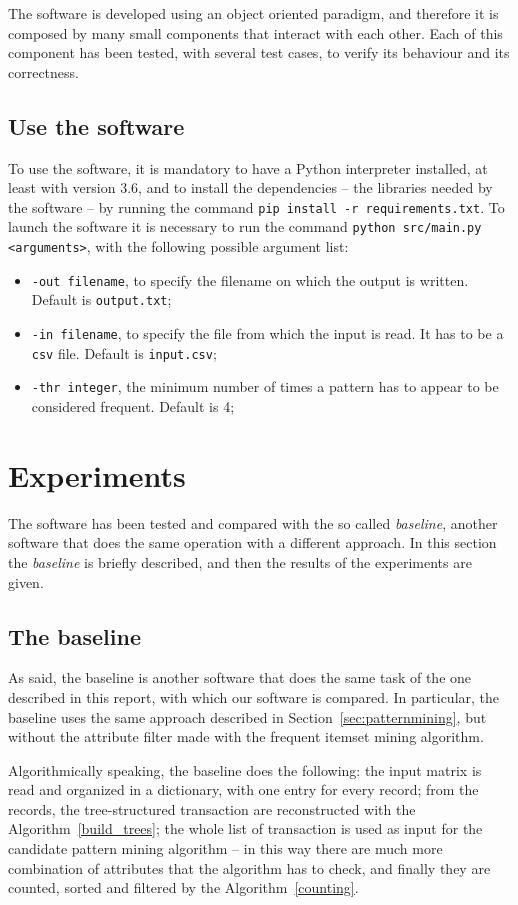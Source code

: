 \documentclass{acm_proc_article-sp-sigmod09}
\begin{document}
The software is developed using an object oriented paradigm, and therefore it is composed by many small components that interact with each other. Each of this component has been tested, with several test cases, to verify its behaviour and its correctness.

\subsection{Use the software}
To use the software, it is mandatory to have a Python interpreter installed, at least with version 3.6, and to install the dependencies -- the libraries needed by the software -- by running the command \texttt{pip install -r requirements.txt}. To launch the software it is necessary to run the command \texttt{python src/main.py <arguments>}, with the following possible argument list:
\begin{itemize}
\item \texttt{-out filename}, to specify the filename on which the output is written. Default is \texttt{output.txt};
\item \texttt{-in filename}, to specify the file from which the input is read. It has to be a \texttt{csv} file. Default is \texttt{input.csv};
\item \texttt{-thr integer}, the minimum number of times a pattern has to appear to be considered frequent. Default is 4;
\end{itemize}
 
\section{Experiments}
The software has been tested and compared with the so called \emph{baseline}, another software that does the same operation with a different approach. In this section the \emph{baseline} is briefly described, and then the results of the experiments are given.

\subsection{The baseline}
As said, the baseline is another software that does the same task of the one described in this report, with which our software is compared. In particular, the baseline uses the same approach described in Section~\ref{sec:patternmining}, but without the attribute filter made with the frequent itemset mining algorithm. 

Algorithmically speaking, the baseline does the following: the input matrix is read and organized in a dictionary, with one entry for every record; from the records, the tree-structured transaction are reconstructed with the Algorithm~\ref{build_trees}; the whole list of transaction is used as input for the candidate pattern mining algorithm -- in this way there are much more combination of attributes that the algorithm has to check, and finally they are counted, sorted and filtered by the Algorithm~\ref{counting}.
\end{document}
